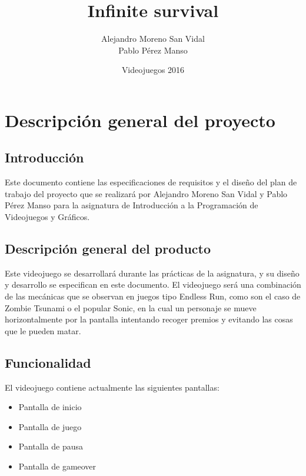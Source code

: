 \documentclass[palatino]{apuntes}
\title{Infinite survival}
\author{Alejandro Moreno San Vidal \\ Pablo Pérez Manso}
\date{Videojuegos 2016}
\begin{document}
\pagestyle{plain}
\maketitle
\tableofcontents
\newpage

\chapter{Descripción general del proyecto}

\section{Introducción}
Este documento contiene las especificaciones de requisitos y el diseño del plan de trabajo del proyecto que se realizará por Alejandro Moreno San Vidal y Pablo Pérez Manso para la asignatura de Introducción a la Programación de Videojuegos y Gráficos.

\section{Descripción general del producto}
Este videojuego se desarrollará durante las prácticas de la asignatura, y su diseño y desarrollo se especifican en este documento. El videojuego será una combinación de las mecánicas que se observan en juegos tipo Endless Run, como son el caso de Zombie Tsunami o el popular Sonic, en la cual un personaje se mueve horizontalmente por la pantalla intentando recoger premios y evitando las cosas que le pueden matar.

\section{Funcionalidad}

El videojuego contiene actualmente las siguientes pantallas:
\begin{itemize}
    \item Pantalla de inicio
    \item Pantalla de juego
    \item Pantalla de pausa
    \item Pantalla de gameover
  
\end{itemize}
\end{document}
